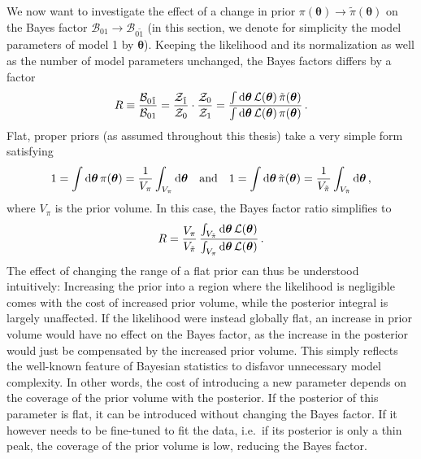 	We now want to investigate the effect of a change in prior $\pi(\bm{\theta}) \rightarrow \tilde{\pi}(\bm{\theta})$ on the Bayes factor $\mathcal{B}_{01} \rightarrow \mathcal{B}_{0{\tilde{1}}}$ (in this section, we denote for  simplicity the model parameters of model 1 by $\bm{\theta}$). Keeping the likelihood and its normalization as well as the number of model parameters unchanged, the Bayes factors differs by a factor
	\begin{align}
		R \equiv \frac{\mathcal{B}_{0{\tilde{1}}}}{\mathcal{B}_{01}} =  \frac{\mathcal{Z}_{\tilde{1}}}{\mathcal{Z}_0}  \cdot \frac{\mathcal{Z}_0}{\mathcal{Z}_1} =  \frac{\int \mathop{}\!\mathrm{d}\bm{\theta} \, \mathcal{L}(\bm{\theta}) \,  \tilde{\pi}(\bm{\theta}) }{\int \mathop{}\!\mathrm{d}\bm{\theta} \, \mathcal{L}(\bm{\theta}) \,  \pi(\bm{\theta}) } \, .
	\end{align}
	Flat, proper priors (as assumed throughout this thesis) take a very simple form satisfying
	\begin{align}
		1 = \int \mathop{}\!\mathrm{d} \bm{\theta} \, \pi(\bm{\theta}) = \frac{1}{V_\pi} \int_{V_\pi} \mathop{}\!\mathrm{d} \bm{\theta} && \text{and} && 1 = \int \mathop{}\!\mathrm{d} \bm{\theta} \, \tilde{\pi} (\bm{\theta}) = \frac{1}{V_{\tilde{\pi}} }   \int_{V_{\tilde{\pi}}} \mathop{}\!\mathrm{d} \bm{\theta} \, ,
	\end{align}
	where $V_\pi$ is the prior volume. In this case, the Bayes factor ratio simplifies to
	\begin{align}
		R  = \frac{V_\pi}{V_{\tilde{\pi}}} \, \frac{\int_{V_{\tilde{\pi}}} \mathop{}\!\mathrm{d} \bm{\theta} \,  \mathcal{L}(\bm{\theta})}{\int_{V_\pi} \mathop{}\!\mathrm{d} \bm{\theta} \, \mathcal{L}(\bm{\theta})} \, . \label{eq:BF_prior_dependence1}
	\end{align}
	The effect of changing the range of a flat prior can thus be understood intuitively: Increasing the prior into a region where the likelihood is negligible comes with the cost of increased prior volume, while the posterior integral is largely unaffected. If the likelihood were instead globally flat, an increase in prior volume would have no effect on the Bayes factor,  as the increase in the posterior would just be compensated by the increased prior volume. This simply reflects the well-known feature of Bayesian statistics to disfavor unnecessary model complexity. In other words, the cost of introducing a new parameter depends on the coverage of the prior volume with the posterior. If the posterior of this parameter is flat, it can be introduced without changing the Bayes factor. If it however needs to be fine-tuned to fit the data, i.e.~if its posterior is only a thin peak, the coverage of the prior volume is low, reducing the Bayes factor.
	
